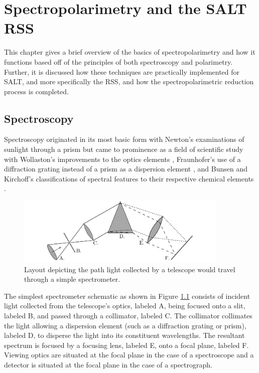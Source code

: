 \chapter{Spectropolarimetry and the SALT RSS}

This chapter gives a brief overview of the basics of spectropolarimetry and how it functions based off of the principles of both spectroscopy and polarimetry. Further, it is discussed how these techniques are practically implemented for \gls{SALT}, and more specifically the \gls{RSS}, and how the spectropolarimetric reduction process is completed.

\section{Spectroscopy}

Spectroscopy originated in its most basic form with Newton's examinations of sunlight through a prism \citep{opticks} but came to prominence as a field of scientific study with Wollaston's improvements to the optics elements \citep{WollPrism}, Fraunhofer's use of a diffraction grating instead of a prism as a dispersion element \citep{FraunGrating}, and Bunsen and Kirchoff's classifications of spectral features to their respective chemical elements \citep{KirBunSpec}.
\prgph

\begin{figure}[t]
    \centering
    \includegraphics[width = 0.9\textwidth]{figures/2_spectrometer.pdf}
    \caption{Layout depicting the path light collected by a telescope would travel through a simple spectrometer.}
    \label{fig:spectrometer}
\end{figure}

The simplest spectrometer schematic as shown in Figure \ref{fig:spectrometer} consists of incident light collected from the telescope's optics, labeled A, being focused onto a slit, labeled B, and passed through a collimator, labeled C. The collimator collimates the light allowing a dispersion element (such as a diffraction grating or prism), labeled D, to disperse the light into its constituent wavelengths. The resultant spectrum is focused by a focusing lens, labeled E, onto a focal plane, labeled F. Viewing optics are situated at the focal plane in the case of a spectroscope and a detector is situated at the focal plane in the case of a spectrograph.
\prgph

